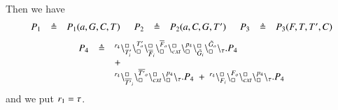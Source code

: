 Then we have 
\[
\begin{array}{lcl @{\hspace{0.5cm}}lcl @{\hspace{0.5cm}}lcl }
P_1 & \defeq & P_1(a,G,C,T) &   P_2 & \defeq & P_2(a,C,G,T') &   P_3 & \defeq & P_3(F,T,T',C)  \\
\end{array}
\]
\[
\begin{array}{lcl}
P_4 & \defeq &\startchain{r_4}\chainedlink{T'_i}{\noact}\chainedlink{\noact}{T'_o}
                                                     \chainedlink{\overline{F}_i}{\noact}\chainedlink{\noact}{\overline{F}_o}
					        \chainedlink{cxt}{\noact}\chainedlink{\noact}{p_4}
					        \chainedlink{\tilde{G}_i}{\noact}\chainedlink{\noact}{\tilde{G}_o}
			\chainend{\silent}.P_4  \\
				&& +\\
&&\startchain{r_4}\chainedlink{\overline{T'}_i}{\noact}\chainedlink{\noact}{\overline{T'}_o}\chainedlink{cxt}{\noact}\chainedlink{\noact}{p_4} \chainend{\silent}.P_4 \ +\  \startchain{r_4}\chainedlink{F_i}{\noact}\chainedlink{\noact}{F_o}\chainedlink{cxt}{\noact}\chainedlink{\noact}{p_4} \chainend{\silent}.P_4
\end{array}
\]
\noindent
and we put $r_1 = \tau$.
